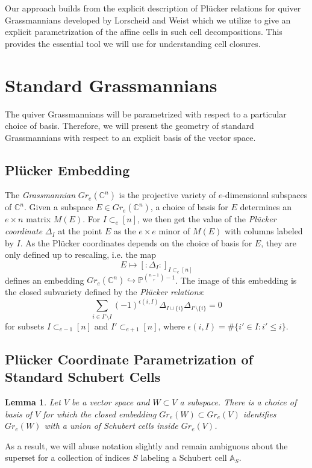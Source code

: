 \documentclass{amsart}
\newtheorem{lemma}[theorem]{Lemma}
\numberwithin{equation}{section}
\renewcommand{\AA}{\mathbb{A}}
\newcommand{\CC}{\mathbb{C}}
\newcommand{\PP}{\mathbb{P}}
\newcommand{\into}{\hookrightarrow}
\begin{document}
  Our approach builds from the explicit description of Pl\"ucker relations for quiver Grassmannians developed by Lorscheid and Weist \cite{lorscheid-weist} which we utilize to give an explicit parametrization of the affine cells in such cell decompositions.
  This provides the essential tool we will use for understanding cell closures.

\section{Standard Grassmannians}

  The quiver Grassmannians will be parametrized with respect to a particular choice of basis.
  Therefore, we will present the geometry of standard Grassmannians with respect to an explicit basis of the vector space.

  \subsection{Pl\"ucker Embedding}
  The \emph{Grassmannian} $Gr_e(\CC^n)$ is the projective variety of $e$-dimensional subspaces of $\CC^n$.
  Given a subspace $E \in Gr_e(\CC^n)$, a choice of basis for $E$ determines an $e\times n$ matrix $M(E)$.
  For $I \subset_e [n]$, we then get the value of the \emph{Pl\"ucker coordinate} $\Delta_I$ at the point $E$ as the $e\times e$ minor of $M(E)$ with columns labeled by $I$.
  As the Pl\"ucker coordinates depends on the choice of basis for $E$, they are only defined up to rescaling, i.e. the map
  \[E \mapsto [:\Delta_I:]_{I\subset_e[n]}\]
  defines an embedding $Gr_e(\CC^n)\into \PP^{{n-1 \choose r} - 1}$.
  The image of this embedding is the closed subvariety defined by the \emph{Pl\"ucker relations}:
  \begin{equation}
    \label{eq:plucker}
    \sum_{i\in I'\setminus I} (-1)^{\epsilon(i,I)} \Delta_{I\cup\{i\}} \Delta_{I'\setminus\{i\}}=0
  \end{equation}
  for subsets $I \subset_{e-1} [n]$ and $I' \subset_{e+1} [n]$, where $\epsilon(i,I)=\#\{i'\in I:i'\le i\}$.

  \subsection{Pl\"ucker Coordinate Parametrization of Standard Schubert Cells}
  
  \begin{lemma}
    Let $V$ be a vector space and $W\subset V$ a subspace.
    There is a choice of basis of $V$ for which the closed embedding $Gr_e(W)\subset Gr_e(V)$ identifies $Gr_e(W)$ with a union of Schubert cells inside $Gr_e(V)$.
  \end{lemma}
  As a result, we will abuse notation slightly and remain ambiguous about the superset for a collection of indices $S$ labeling a Schubert cell $\AA_S$.
\end{document}
